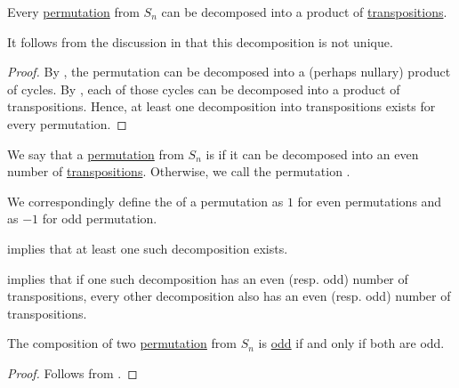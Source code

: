 \begin{proposition}\label{thm:permutation_decomposition_existence}
  Every \hyperref[def:symmetric_group]{permutation} from \( S_n \) can be decomposed into a product of \hyperref[def:cyclic_permutation]{transpositions}.
\end{proposition}
\begin{comments}
  \item It follows from the discussion in  that this decomposition is not unique.
\end{comments}
\begin{proof}
  By , the permutation can be decomposed into a (perhaps nullary) product of cycles. By , each of those cycles can be decomposed into a product of transpositions. Hence, at least one decomposition into transpositions exists for every permutation.
\end{proof}

\begin{definition}\label{def:permutation_parity}\mimprovised
  We say that a \hyperref[def:symmetric_group]{permutation} from \( S_n \) is  if it can be decomposed into an even number of \hyperref[def:cyclic_permutation]{transpositions}. Otherwise, we call the permutation .

  We correspondingly define the  of a permutation as \( 1 \) for even permutations and as \( -1 \) for odd permutation.
\end{definition}
\begin{defproof}
   implies that at least one such decomposition exists.

   implies that if one such decomposition has an even (resp. odd) number of transpositions, every other decomposition also has an even (resp. odd) number of transpositions.
\end{defproof}

\begin{proposition}\label{thm:permutation_product_parity}
  The composition of two \hyperref[def:symmetric_group]{permutation} from \( S_n \) is \hyperref[def:permutation_parity]{odd} if and only if both are odd.
\end{proposition}
\begin{proof}
  Follows from .
\end{proof}

